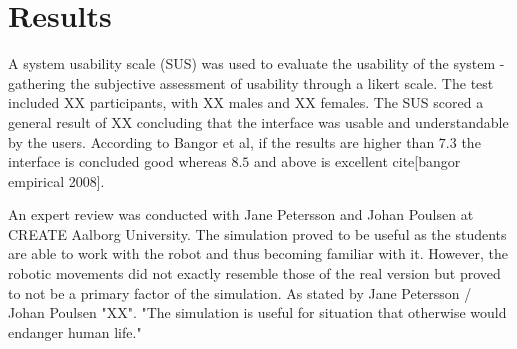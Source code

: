 \section{Results}
A system usability scale (SUS) was used to evaluate the usability of the system - gathering the subjective assessment of usability through a likert scale. The test included XX participants, with XX males and XX females. The SUS scored a general result of XX concluding that the interface was usable and understandable by the users. According to Bangor et al, if the results are higher than $7.3$ the interface is concluded good whereas $8.5$ and above is excellent cite[bangor empirical 2008].

An expert review was conducted with Jane Petersson and Johan Poulsen at CREATE Aalborg University. The simulation proved to be useful as the students are able to work with the robot and thus becoming familiar with it. However, the robotic movements did not exactly resemble those of the real version but proved to not be a primary factor of the simulation. As stated by Jane Petersson / Johan Poulsen "XX". "The simulation is useful for situation that otherwise would endanger human life."

